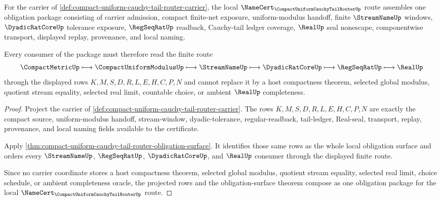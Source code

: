 \begin{theorem}
\label{thm:compact-uniform-cauchy-tail-router-obligation-upgrade}
For the carrier of \autoref{def:compact-uniform-cauchy-tail-router-carrier}, the local $\NameCert_{\CompactUniformCauchyTailRouterUp}$ route assembles one obligation package consisting of carrier admission, compact finite-net exposure, uniform-modulus handoff, finite $\StreamNameUp$ windows, $\DyadicRatCoreUp$ tolerance exposure, $\RegSeqRatUp$ readback, Cauchy-tail ledger coverage, $\RealUp$ seal nonescape, componentwise transport, displayed replay, provenance, and local naming.

Every consumer of the package must therefore read the finite route
$$
\CompactMetricUp \longmapsto \CompactUniformModulusUp \longmapsto \StreamNameUp \longmapsto \DyadicRatCoreUp \longmapsto \RegSeqRatUp \longmapsto \RealUp
$$
through the displayed rows $K,M,S,D,R,L,E,H,C,P,N$ and cannot replace it by a host compactness theorem, selected global modulus, quotient stream equality, selected real limit, countable choice, or ambient $\RealUp$ completeness.
\end{theorem}
\begin{proof}
Project the carrier of \autoref{def:compact-uniform-cauchy-tail-router-carrier}. The rows $K,M,S,D,R,L,E,H,C,P,N$ are exactly the compact source, uniform-modulus handoff, stream-window, dyadic-tolerance, regular-readback, tail-ledger, Real-seal, transport, replay, provenance, and local naming fields available to the certificate.

Apply \autoref{thm:compact-uniform-cauchy-tail-router-obligation-surface}. It identifies those same rows as the whole local obligation surface and orders every $\StreamNameUp$, $\RegSeqRatUp$, $\DyadicRatCoreUp$, and $\RealUp$ consumer through the displayed finite route.

Since no carrier coordinate stores a host compactness theorem, selected global modulus, quotient stream equality, selected real limit, choice schedule, or ambient completeness oracle, the projected rows and the obligation-surface theorem compose as one obligation package for the local $\NameCert_{\CompactUniformCauchyTailRouterUp}$ route.
\end{proof}


